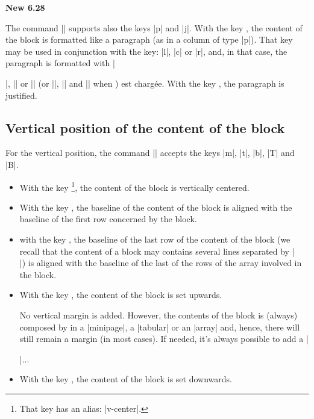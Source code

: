 \documentclass[dvipsnames]{article}%
\begin{document}
\bigskip
\colorbox{yellow!50}{\bfseries New 6.28}\par\nobreak

\smallskip
The command |\Block| supports also the keys |p| and |j|. With the key
, the content of the block is formatted like a paragraph (as in a
column of type |p|). That key may be used in conjunction with the key: |l|, |c|
or |r|, and, in that case, the paragraph is formatted with |\raggedright|,
|\centering| or |\raggedleft| (or |\RaggedRight|, |\Centering| and |\RaggedLeft|
when ) est chargée. With the key , the paragraph is
justified.

\subsection{Vertical position of the content of the block}

\label{vertical-pos-block}

For the vertical position, the command |\Blocks| accepts the keys
|m|, |t|, |b|, |T| and |B|.


\begin{itemize}
\item {}
With the key \footnote{That key has an alias: |v-center|.}, the content of the block is vertically centered.
\item With the key , the baseline of the content of the block is aligned
with the baseline of the first row concerned by the block.
\item with the key , the baseline of the last row of the content of the
block (we recall that the content of a block may contains several lines
separated by |\\|) is aligned with the baseline of the last of the rows of the
array involved in the block.
\item With the key , the content of the block is set upwards. 

No vertical margin is added. However, the contents of the block is (always)
composed by  in a |{minipage}|, a |{tabular}| or an |{array}|
and, hence, there will still remain a margin (in most cases). If needed, it's
always possible to add a |\strut|...

\item With the key , the content of the block is set downwards.
\end{itemize}
\end{document}
